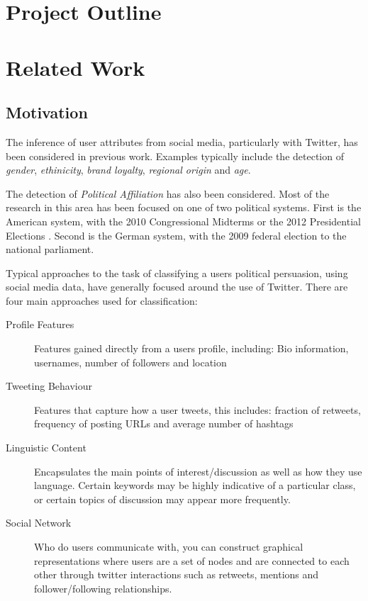 \documentclass[bsc,frontabs,singlespacing,parskip]{infthesis}     %
\begin{document}
\chapter{Project Outline}
\chapter{Related Work}

\section{Motivation}
The inference of user attributes from social media, particularly with Twitter, has been considered in previous work. Examples typically include the detection of \textit{gender}, \textit{ethinicity}, \textit{brand loyalty}, \textit{regional origin} and \textit{age}.\cite{yahoopaper}\cite{rao2010}

The detection of \textit{Political Affiliation} has also been considered. Most of the research in this area has been focused on one of two political systems. First is the American system, with the 2010 Congressional Midterms\cite{Conover2010predicting}  \cite{politicalpolarisation}\cite{yahoopaper} or the 2012 Presidential Elections \cite{quantpol}. Second is the German system, with the 2009 federal election to the national parliament\cite{predelections}\cite{dividedtheytweet}. 

Typical approaches to the task of classifying a users political persuasion, using social media data, have generally focused around the use of Twitter. There are four main approaches used for classification:

\begin{description}
\item[Profile Features] Features gained directly from a users profile, including: Bio information, usernames, number of followers and location
\item[Tweeting Behaviour] Features that capture how a user tweets, this includes: fraction of retweets, frequency of posting URLs and average number of hashtags
\item[Linguistic Content] Encapsulates the main points of interest/discussion as well as how they use language. Certain keywords may be highly indicative of a particular class, or certain topics of discussion may appear more frequently.
\item[Social Network] Who do users communicate with, you can construct graphical representations where users are a set of nodes and are connected to each other through twitter interactions such as retweets, mentions and follower/following relationships.
\end{description}
\end{document}
